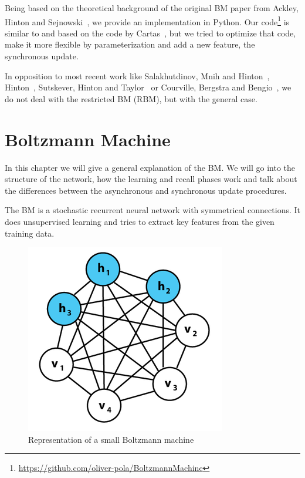 \documentclass[12pt,twoside]{article}
\theoremstyle{plain}
\theoremstyle{definition}
\theoremstyle{remark}
\begin{document}
Being based on the theoretical background of the original BM paper from Ackley, Hinton and Sejnowski~\cite{Ackley}, we provide an implementation in Python. Our code\footnote{\url{https://github.com/oliver-pola/BoltzmannMachine}} is similar to and based on the code by Cartas~\cite{BMImpl}, but we tried to optimize that code, make it more flexible by parameterization and add a new feature, the synchronous update.

In opposition to most recent work like Salakhutdinov, Mnih and Hinton~\cite{Salakhutdinov}, Hinton~\cite{Hinton}, Sutskever, Hinton and Taylor~\cite{Sutskever} or Courville, Bergstra and Bengio~\cite{Courville}, we do not deal with the restricted BM (RBM), but with the general case.


\section{Boltzmann Machine}
\label{sec:bm}

In this chapter we will give a general explanation of the BM. We will go into the structure of the network, how the learning and recall phases work and talk about the differences between the asynchronous and synchronous update procedures.

The BM is a stochastic recurrent neural network with symmetrical connections.
It does unsupervised learning and tries to extract key features from the given training data.

\begin{figure}[h]
	\centering
	\includegraphics[height=0.2\textheight]{src/boltzmann_graph}
	\caption[Representation of a small Boltzmann machine]{Representation of a small Boltzmann machine\footnotemark}
	\label{fig:boltzmann-graph}
\end{figure}
\end{document}
